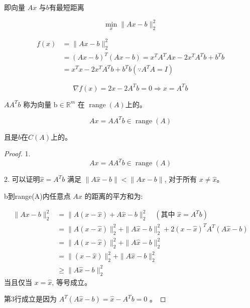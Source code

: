 即向量 $ A x $ 与$b$有最短距离

$$
\min _{x}\|A x-b\|_{2}^{2}
$$

$$ \begin{aligned} f(x) &=\|A x-b\|_{2}^{2}
    \\ & =(A x-b)^{T}(A x-b)=x^{T} A^{T} A x-2 x^{T} A^{T} b+b^{T} b \\ &=x^{T} x-2 x^{T} A^{T} b+b^{T} b\left(\because A^{T} A=I\right) \end{aligned} $$

$$ \nabla f(x)=2 x-2 A^{T} b=0 \Rightarrow x=A^{T} b $$

$ A A^{T} b $ 称为向量 $ \mathrm{b} \in \mathbb{R}^{m} $ 在 $ \operatorname{range} (A)$上的。

\begin{theorem}
    $$ A x=A A^{T} b \in \operatorname{range}(A) $$

    且是$b$在$C(A)$上的。
\end{theorem}

\begin{proof}
    1.
    $$ A x=A A^{T} b \in \operatorname{range}(A) $$

    2. 可以证明$ \hat{x}=A^{T} b $ 满足 $ \|A \hat{x}-b\|<\|A x-b\| $, 对于所有 $ x \neq \hat{x} $。

    b到range(A)内任意点 $ A x $ 的距离的平方和为:

    $$ \begin{aligned}\|A x-b\|_{2}^{2} &=\|A(x-\hat{x})+A \hat{x}-b\|_{2}^{2} \quad\left(\text {其中 } \hat{x}=A^{T} b\right) \\ &=\|A(x-\hat{x})\|_{2}^{2}+\|A \hat{x}-b\|_{2}^{2}+2(x-\hat{x})^{T} A^{T}(A \hat{x}-b) \\ &=\|A(x-\hat{x})\|_{2}^{2}+\|A \hat{x}-b\|_{2}^{2} \\ &=\|(x-\hat{x})\|_{2}^{2}+\|A \hat{x}-b\|_{2}^{2} \\ & \geq\|A \hat{x}-b\|_{2}^{2} \end{aligned} $$
当且仅当 $ x=\hat{x} $, 等号成立。

第3行成立是因为 $ A^{T}(A \hat{x}-b)=\hat{x}-A^{T} b=0 $ 。
\end{proof}

